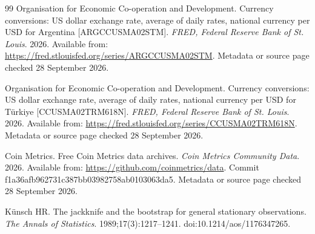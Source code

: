 \begin{thebibliography}{99}
Organisation for Economic Co-operation and Development.
Currency conversions: US dollar exchange rate, average of daily rates, national currency per USD for Argentina [ARGCCUSMA02STM].
\textit{FRED, Federal Reserve Bank of St. Louis}. 2026.
Available from: \url{https://fred.stlouisfed.org/series/ARGCCUSMA02STM}. Metadata or source page checked 28 September 2026.

Organisation for Economic Co-operation and Development.
Currency conversions: US dollar exchange rate, average of daily rates, national currency per USD for T\"urkiye [CCUSMA02TRM618N].
\textit{FRED, Federal Reserve Bank of St. Louis}. 2026.
Available from: \url{https://fred.stlouisfed.org/series/CCUSMA02TRM618N}. Metadata or source page checked 28 September 2026.

Coin Metrics.
Free Coin Metrics data archives.
\textit{Coin Metrics Community Data}. 2026.
Available from: \url{https://github.com/coinmetrics/data}. Commit f1a36afb962731c387bb03982758ab0103063da5. Metadata or source page checked 28 September 2026.

K\"unsch HR.
The jackknife and the bootstrap for general stationary observations.
\textit{The Annals of Statistics}. 1989;17(3):1217--1241.
doi:10.1214/aos/1176347265.

\end{thebibliography}
